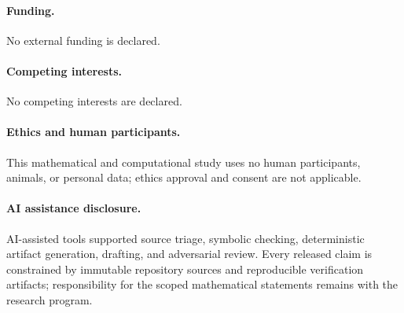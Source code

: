 \documentclass[11pt]{article}
\theoremstyle{definition}
\theoremstyle{remark}
\begin{document}
\paragraph{Funding.}
No external funding is declared.

\paragraph{Competing interests.}
No competing interests are declared.

\paragraph{Ethics and human participants.}
This mathematical and computational study uses no human participants,
animals, or personal data; ethics approval and consent are not applicable.

\paragraph{AI assistance disclosure.}
AI-assisted tools supported source triage, symbolic checking, deterministic
artifact generation, drafting, and adversarial review.  Every released
claim is constrained by immutable repository sources and reproducible
verification artifacts; responsibility for the scoped mathematical
statements remains with the research program.



\end{document}
